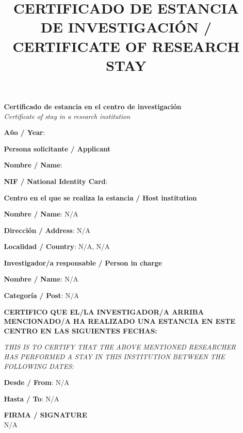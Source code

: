 \documentclass[11pt,a4paper,oneside]{article}
\title{CERTIFICADO DE ESTANCIA DE INVESTIGACIÓN / CERTIFICATE OF RESEARCH STAY}
\date{}
\newcommand{\PhDFormSection}[1]{%
  \vspace{0.45cm}\noindent\textbf{\large #1}\par\smallskip}
\newcommand{\PhDFormField}[2]{%
  \noindent\textbf{#1}: #2\par}
\newcommand{\PhDNA}{N/A}
\providecommand{\myResearchStayInstitution}{\PhDNA}
\providecommand{\myResearchStayDepartment}{\PhDNA}
\providecommand{\myResearchStayCity}{\PhDNA}
\providecommand{\myResearchStayCountry}{\PhDNA}
\providecommand{\myResearchStaySupervisorFullName}{\PhDNA}
\providecommand{\myResearchStaySupervisorPosition}{\PhDNA}
\providecommand{\myResearchStayStartDate}{\PhDNA}
\providecommand{\myResearchStayEndDate}{\PhDNA}
\begin{document}
\maketitle
\thispagestyle{empty}

\begin{center}
\textbf{Certificado de estancia en el centro de investigación}\\
\textit{Certificate of stay in a research institution}
\end{center}

\PhDFormField{Año / Year}{\myThesisDefenseYear}
\PhDFormSection{Persona solicitante / Applicant}
\PhDFormField{Nombre / Name}{\myAuthorFullName}
\PhDFormField{NIF / National Identity Card}{\myAuthorDNI}

\PhDFormSection{Centro en el que se realiza la estancia / Host institution}
\PhDFormField{Nombre / Name}{\myResearchStayInstitution}
\PhDFormField{Dirección / Address}{\myResearchStayDepartment}
\PhDFormField{Localidad / Country}{\myResearchStayCity, \myResearchStayCountry}

\PhDFormSection{Investigador/a responsable / Person in charge}
\PhDFormField{Nombre / Name}{\myResearchStaySupervisorFullName}
\PhDFormField{Categoría / Post}{\myResearchStaySupervisorPosition}

\vspace{0.7cm}
\textbf{CERTIFICO QUE EL/LA INVESTIGADOR/A ARRIBA MENCIONADO/A HA REALIZADO UNA ESTANCIA EN ESTE CENTRO EN LAS SIGUIENTES FECHAS:}\par
\textit{THIS IS TO CERTIFY THAT THE ABOVE MENTIONED RESEARCHER HAS PERFORMED A STAY IN THIS INSTITUTION BETWEEN THE FOLLOWING DATES:}

\vspace{0.5cm}
\PhDFormField{Desde / From}{\myResearchStayStartDate}
\PhDFormField{Hasta / To}{\myResearchStayEndDate}

\vfill
\begin{flushright}
\textbf{FIRMA / SIGNATURE}\\[2cm]
\myResearchStaySupervisorFullName
\end{flushright}
\end{document}
